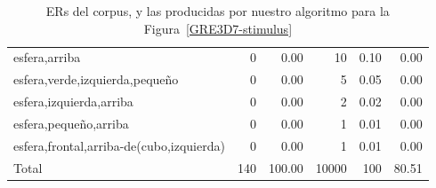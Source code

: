 \begin{table}
\begin{small}
\begin{center}
\begin{tabular}{|l|r|r|r|r|r|}
esfera,arriba                                      &  0 &  0.00 &   10 &  0.10 &  0.00\\
esfera,verde,izquierda,peque\~no                         &  0 &  0.00 &    5 &  0.05 &  0.00\\
esfera,izquierda,arriba                                 &  0 &  0.00 &    2 &  0.02 &  0.00\\
esfera,peque\~no,arriba                                &  0 &  0.00 &    1 &  0.01 &  0.00\\
esfera,frontal,arriba-de(cubo,izquierda)                  &  0 &  0.00 &    1 &  0.01 &  0.00\\

\hline
Total & 140 & 100.00 & 10000 & 100 & 80.51 \\
\hline
\end{tabular}
\caption{ERs del corpus, y las producidas por nuestro algoritmo para la Figura~\ref{GRE3D7-stimulus}\label{results-algo-fig3}}
\vspace*{-.5cm}
\end{center}
\end{small}
\end{table}





